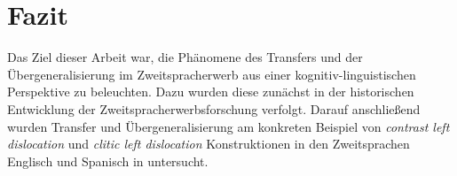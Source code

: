 \section{Fazit}

\begin{comment}
    * Einleitung und Fazit müssen zusammenpassen.
    * sind die Erkenntnisse im Fazit aus der Arbeit ableitbar?
    * Vorgehensweise zusammenfassen

Kritische Zusammenfassung
\begin{itemize}
    \item was war in den Texten nicht so gelungen?
    \item welche Fragen sind offen geblieben?
    \item in welche Richtung kann noch weiter geforscht werden?
    \item was sind gegnerische Meinungen zum Thema?
\end{itemize}
\end{comment}


Das Ziel dieser Arbeit war, die Phänomene des Transfers und der Übergeneralisierung im Zweitspracherwerb aus einer kognitiv-linguistischen Perspektive zu beleuchten.
Dazu wurden diese zunächst in der historischen Entwicklung der Zweitspracherwerbsforschung verfolgt.
Darauf anschließend wurden Transfer und Übergeneralisierung am konkreten Beispiel von \textit{contrast left dislocation} und \textit{clitic left dislocation} Konstruktionen in den Zweitsprachen Englisch und Spanisch in \cite{Valenzuela05} untersucht.

\begin{comment}
Die vorliegende Arbeit konzentriert sich auf den (erwachsenen) Zweitspracherwerb (L2-Erwerb).
Es werden dabei Phänomene wie Transfer aus der Erstsprache (L1) und Übergeneralisierung bestimmter L2-Konstruktionen beobachtet.
Diese lassen sich in einem kognitiv-linguistischen/konstruktionsgrammatischen theoretischen Rahmen erklären.
Das wird am Beispiel einer Studie von Elena Valenzuela \cite{Valenzuela05} über die \textit{contrast left dislocation} (CLD) und \textit{clitic left dislocation} (CLLD) Konstruktionen im Spanischen und Englischen demonstriert.

Im Weiteren ist diese Arbeit wie folgt aufgebaut:
Kapitel 2 erläutert die theoretischen Grundlagen -- es wird eine kurze Übersicht über ausschlaggebende Annahmen der kognitiven Linguistik, der Konstruktionsgrammatik und der Erst- und Zweitspracherwerbsforschung im Rahmen dieser Theorien gegeben.
Kapitel 3 beschreibt die historische Entwicklung der Spracherwerbsforschung mit Schwerpunkt Wechselwirkungen (Übergeneralisierung und Transfer) zwischen L1 und L2 aus einer konstruktionsgrammatischen gebrauchsgestützten Perspektive.
In Kapitel 4 werden die Phänomene der Übergeneralisierung und Transfer auf dem Beispiel von CLD und CLLD-Konstruktionen im Spanischen und Englischen untersucht.
Die Ergebnisse werden dann in Kapitel 5 zusammengefasst. %
\end{comment}


